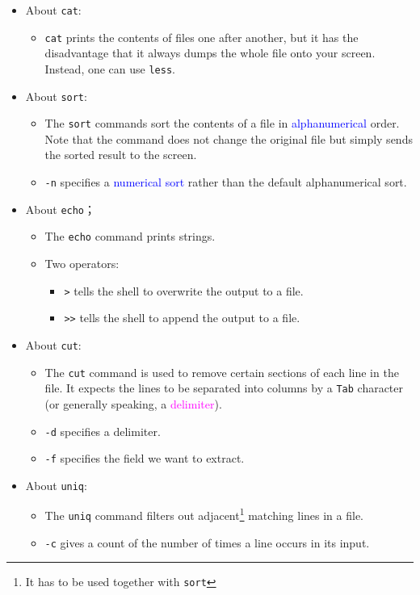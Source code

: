 \documentclass[UTF8]{book}
\newcommand{\code}[1]{\colorbox{codegray}{\texttt{#1}}}
\begin{document}
\begin{itemize}
\begin{itemize}
\end{itemize}
\item About \code{cat}:
\begin{itemize}
	\item \code{cat} prints the contents of files one after another, but it has the disadvantage that it always dumps the whole file onto your screen. Instead, one can use \code{less}.
\end{itemize}
\item About \code{sort}:
\begin{itemize}
	\item The \code{sort} commands sort the contents of a file in \textcolor{blue}{alphanumerical} order. Note that the command does not change the original file but simply sends the sorted result to the screen.
	\item \code{-n} specifies a \textcolor{blue}{numerical sort} rather than the default alphanumerical sort.
\end{itemize}
\item About \code{echo}；
\begin{itemize}
	\item The \code{echo} command prints strings.
	\item Two operators:
	\begin{itemize}
		\item \code{>} tells the shell to overwrite the output to a file.
		\item \code{>>} tells the shell to append the output to a file.
	\end{itemize}
\end{itemize}
\item About \code{cut}:
\begin{itemize}
	\item The \code{cut} command is used to remove certain sections of each line in the file. It expects the lines to be separated into columns by a \code{Tab} character (or generally speaking, a \textcolor{magenta}{delimiter}).
	\item \code{-d} specifies a delimiter.
	\item \code{-f} specifies the field we want to extract.
\end{itemize}
\item About \code{uniq}:
\begin{itemize}
	\item The \code{uniq} command filters out adjacent\footnote{It has to be used together with \code{sort}} matching lines in a file. 
	\item \code{-c} gives a count of the number of times a line occurs in its input.

\end{itemize}
\end{itemize}
\end{document}
